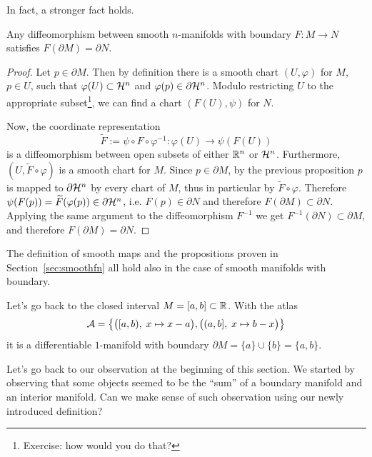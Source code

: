 In fact, a stronger fact holds.
\begin{proposition}
	Any diffeomorphism between smooth $n$-manifolds with boundary $F: M \to N$ satisfies $F(\partial M) = \partial N$.
\end{proposition}
\begin{proof}
	Let $p\in\partial M$.
	Then by definition there is a smooth chart $(U,\varphi)$ for $M$, $p\in U$, such that $\varphi(U)\subset\mathcal{H}^n$ and $\varphi(p)\in\partial\mathcal{H}^n$.
	Modulo restricting $U$ to the appropriate subset\footnote{Exercise: how would you do that?}, we can find a chart $(F(U), \psi)$ for $N$.

	Now, the coordinate representation
	\begin{equation}
		\widetilde{F} := \psi \circ F \circ \varphi^{-1} : \varphi(U) \to \psi(F(U))
	\end{equation}
	is a diffeomorphism between open subsets of either $\mathbb{R}^n$ or $\mathcal{H}^n$.
	Furthermore, $(U, \widetilde{F}\circ\varphi)$ is a smooth chart for $M$.
	Since $p\in\partial M$, by the previous proposition $p$ is mapped to $\partial\mathcal{H}^n$ by every chart of $M$, thus in particular by $\widetilde{F}\circ\varphi$. Therefore $\psi(F(p)) = \widetilde{F}(\varphi(p))\in\partial\mathcal{H}^n$, i.e. $F(p)\in \partial N$ and therefore $F(\partial M)\subset \partial N$.
	Applying the same argument to the diffeomorphism $F^{-1}$ we get $F^{-1}(\partial N)\subset\partial M$, and therefore $F(\partial M) = \partial N$.
\end{proof}

\begin{remark}
	The definition of smooth maps and the propositions proven in Section~\ref{sec:smoothfn} all hold also in the case of smooth manifolds with boundary.
\end{remark}

\begin{example}\label{ex:mfldbdryinterval}
	Let's go back to the closed interval $M=[a,b]\subset\mathbb{R}$.
	With the atlas
	\begin{equation}
		\mathcal{A}=\big\{
		\big([a,b), \; x\mapsto x-a\big),
		\big((a,b], \; x\mapsto b-x\big)
		\big\}
	\end{equation}
	it is a differentiable $1$-manifold with boundary $\partial M = \{a\} \cup \{b\} = \{a, b\}$.
\end{example}

Let's go back to our observation at the beginning of this section.
We started by observing that some objects seemed to be the ``sum'' of a boundary manifold and an interior manifold.
Can we make sense of such observation using our newly introduced definition?

